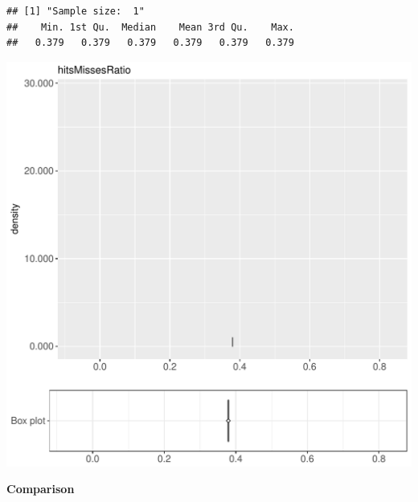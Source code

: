 \documentclass{article}\usepackage[]{graphicx}\usepackage[]{color}
\makeatletter
\def\maxwidth{ %
  \ifdim\Gin@nat@width>\linewidth
    \linewidth
  \else
    \Gin@nat@width
  \fi
}
\newenvironment{kframe}{%
 \def\at@end@of@kframe{}%
 \ifinner\ifhmode%
  \def\at@end@of@kframe{\end{minipage}}%
  \begin{minipage}{\columnwidth}%
 \fi\fi%
 \def\FrameCommand##1{\hskip\@totalleftmargin \hskip-\fboxsep
 \colorbox{shadecolor}{##1}\hskip-\fboxsep
     \hskip-\linewidth \hskip-\@totalleftmargin \hskip\columnwidth}%
 \MakeFramed {\advance\hsize-\width
   \@totalleftmargin\z@ \linewidth\hsize
   \@setminipage}}%
 {\par\unskip\endMakeFramed%
 \at@end@of@kframe}
\newenvironment{knitrout}{}{} %
\makeatother
\begin{document}
\begin{knitrout}
\color{fgcolor}\begin{kframe}
\begin{verbatim}
## [1] "Sample size:  1"
##    Min. 1st Qu.  Median    Mean 3rd Qu.    Max. 
##   0.379   0.379   0.379   0.379   0.379   0.379
\end{verbatim}


{\ttfamily\noindent\bfseries{}}\end{kframe}
\includegraphics[width=\maxwidth]{figure/RH5_trivialcaching_crime-1} 

\end{knitrout}
  
 \textbf{Comparison}
  
\end{document}
